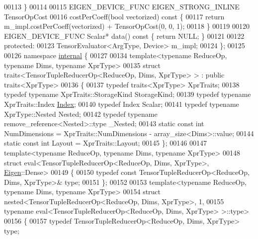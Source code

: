 \begin{DoxyCode}
00113   \}
00114 
00115   EIGEN\_DEVICE\_FUNC EIGEN\_STRONG\_INLINE TensorOpCost
00116   costPerCoeff(\textcolor{keywordtype}{bool} vectorized)\textcolor{keyword}{ const }\{
00117     \textcolor{keywordflow}{return} m\_impl.costPerCoeff(vectorized) + TensorOpCost(0, 0, 1);
00118   \}
00119 
00120   EIGEN\_DEVICE\_FUNC Scalar* data()\textcolor{keyword}{ const }\{ \textcolor{keywordflow}{return} NULL; \}
00121 
00122  \textcolor{keyword}{protected}:
00123   TensorEvaluator<ArgType, Device> m\_impl;
00124 \};
00125 
00126 \textcolor{keyword}{namespace }\hyperlink{namespaceinternal}{internal} \{
00127 
00134 \textcolor{keyword}{template}<\textcolor{keyword}{typename} ReduceOp, \textcolor{keyword}{typename} Dims, \textcolor{keyword}{typename} XprType>
00135 \textcolor{keyword}{struct }traits<TensorTupleReducerOp<ReduceOp, Dims, XprType> > : \textcolor{keyword}{public} traits<XprType>
00136 \{
00137   \textcolor{keyword}{typedef} traits<XprType> XprTraits;
00138   \textcolor{keyword}{typedef} \textcolor{keyword}{typename} XprTraits::StorageKind StorageKind;
00139   \textcolor{keyword}{typedef} \textcolor{keyword}{typename} XprTraits::Index \hyperlink{namespace_eigen_a62e77e0933482dafde8fe197d9a2cfde}{Index};
00140   \textcolor{keyword}{typedef} Index Scalar;
00141   \textcolor{keyword}{typedef} \textcolor{keyword}{typename} XprType::Nested Nested;
00142   \textcolor{keyword}{typedef} \textcolor{keyword}{typename} remove\_reference<Nested>::type \_Nested;
00143   \textcolor{keyword}{static} \textcolor{keyword}{const} \textcolor{keywordtype}{int} NumDimensions = XprTraits::NumDimensions - array\_size<Dims>::value;
00144   \textcolor{keyword}{static} \textcolor{keyword}{const} \textcolor{keywordtype}{int} Layout = XprTraits::Layout;
00145 \};
00146 
00147 \textcolor{keyword}{template}<\textcolor{keyword}{typename} ReduceOp, \textcolor{keyword}{typename} Dims, \textcolor{keyword}{typename} XprType>
00148 \textcolor{keyword}{struct }eval<TensorTupleReducerOp<ReduceOp, Dims, XprType>, \hyperlink{namespace_eigen}{Eigen}::Dense>
00149 \{
00150   \textcolor{keyword}{typedef} \textcolor{keyword}{const} TensorTupleReducerOp<ReduceOp, Dims, XprType>& type;
00151 \};
00152 
00153 \textcolor{keyword}{template}<\textcolor{keyword}{typename} ReduceOp, \textcolor{keyword}{typename} Dims, \textcolor{keyword}{typename} XprType>
00154 \textcolor{keyword}{struct }nested<TensorTupleReducerOp<ReduceOp, Dims, XprType>, 1,
00155               typename eval<TensorTupleReducerOp<ReduceOp, Dims, XprType> >::type>
00156 \{
00157   \textcolor{keyword}{typedef} TensorTupleReducerOp<ReduceOp, Dims, XprType> type;

\end{DoxyCode}
